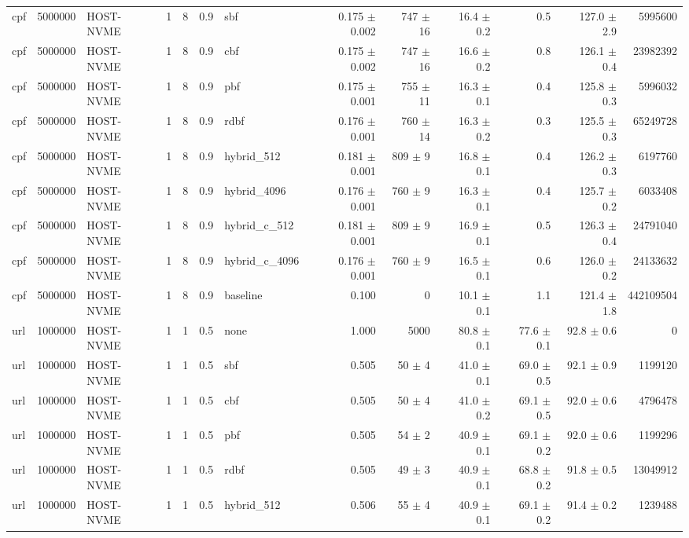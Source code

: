 \begin{tabular}{lllllllrrrrrr}
cpf & 5000000 & HOST-NVME & 1 & 8 & 0.9 & sbf & 0.175 $\pm$ 0.002 & 747 $\pm$ 16 & 16.4 $\pm$ 0.2 & 0.5 & 127.0 $\pm$ 2.9 & 5995600 \\
cpf & 5000000 & HOST-NVME & 1 & 8 & 0.9 & cbf & 0.175 $\pm$ 0.002 & 747 $\pm$ 16 & 16.6 $\pm$ 0.2 & 0.8 & 126.1 $\pm$ 0.4 & 23982392 \\
cpf & 5000000 & HOST-NVME & 1 & 8 & 0.9 & pbf & 0.175 $\pm$ 0.001 & 755 $\pm$ 11 & 16.3 $\pm$ 0.1 & 0.4 & 125.8 $\pm$ 0.3 & 5996032 \\
cpf & 5000000 & HOST-NVME & 1 & 8 & 0.9 & rdbf & 0.176 $\pm$ 0.001 & 760 $\pm$ 14 & 16.3 $\pm$ 0.2 & 0.3 & 125.5 $\pm$ 0.3 & 65249728 \\
cpf & 5000000 & HOST-NVME & 1 & 8 & 0.9 & hybrid\_512 & 0.181 $\pm$ 0.001 & 809 $\pm$ 9 & 16.8 $\pm$ 0.1 & 0.4 & 126.2 $\pm$ 0.3 & 6197760 \\
cpf & 5000000 & HOST-NVME & 1 & 8 & 0.9 & hybrid\_4096 & 0.176 $\pm$ 0.001 & 760 $\pm$ 9 & 16.3 $\pm$ 0.1 & 0.4 & 125.7 $\pm$ 0.2 & 6033408 \\
cpf & 5000000 & HOST-NVME & 1 & 8 & 0.9 & hybrid\_c\_512 & 0.181 $\pm$ 0.001 & 809 $\pm$ 9 & 16.9 $\pm$ 0.1 & 0.5 & 126.3 $\pm$ 0.4 & 24791040 \\
cpf & 5000000 & HOST-NVME & 1 & 8 & 0.9 & hybrid\_c\_4096 & 0.176 $\pm$ 0.001 & 760 $\pm$ 9 & 16.5 $\pm$ 0.1 & 0.6 & 126.0 $\pm$ 0.2 & 24133632 \\
cpf & 5000000 & HOST-NVME & 1 & 8 & 0.9 & baseline & 0.100 & 0 & 10.1 $\pm$ 0.1 & 1.1 & 121.4 $\pm$ 1.8 & 442109504 \\
url & 1000000 & HOST-NVME & 1 & 1 & 0.5 & none & 1.000 & 5000 & 80.8 $\pm$ 0.1 & 77.6 $\pm$ 0.1 & 92.8 $\pm$ 0.6 & 0 \\
url & 1000000 & HOST-NVME & 1 & 1 & 0.5 & sbf & 0.505 & 50 $\pm$ 4 & 41.0 $\pm$ 0.1 & 69.0 $\pm$ 0.5 & 92.1 $\pm$ 0.9 & 1199120 \\
url & 1000000 & HOST-NVME & 1 & 1 & 0.5 & cbf & 0.505 & 50 $\pm$ 4 & 41.0 $\pm$ 0.2 & 69.1 $\pm$ 0.5 & 92.0 $\pm$ 0.6 & 4796478 \\
url & 1000000 & HOST-NVME & 1 & 1 & 0.5 & pbf & 0.505 & 54 $\pm$ 2 & 40.9 $\pm$ 0.1 & 69.1 $\pm$ 0.2 & 92.0 $\pm$ 0.6 & 1199296 \\
url & 1000000 & HOST-NVME & 1 & 1 & 0.5 & rdbf & 0.505 & 49 $\pm$ 3 & 40.9 $\pm$ 0.1 & 68.8 $\pm$ 0.2 & 91.8 $\pm$ 0.5 & 13049912 \\
url & 1000000 & HOST-NVME & 1 & 1 & 0.5 & hybrid\_512 & 0.506 & 55 $\pm$ 4 & 40.9 $\pm$ 0.1 & 69.1 $\pm$ 0.2 & 91.4 $\pm$ 0.2 & 1239488 \\

\end{tabular}
